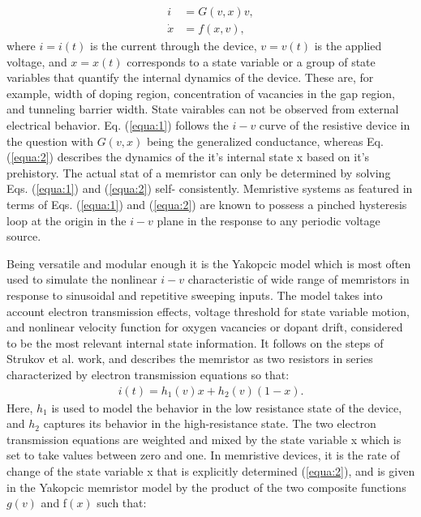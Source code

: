 \documentclass[10pt]{article}
\begin{document}
\begin{multicols}{2}
        \begin{align}
            i &= G(v,x)v, \label{equa:1} \\
            \dot{x} &= f(x,v), \label{equa:2}
        \end{align}
        where $i = i(t)$ is the current through the device, $v = v(t)$ is the applied voltage, and $x = x(t)$ corresponds to a state variable or a group of state variables that quantify the internal dynamics of the device. These are, for example, width of doping region, concentration of vacancies in the gap region, and tunneling barrier width\cite{cit8}. State vairables can not be observed from external electrical behavior. Eq. (\hyperref[equa:1]{\ref{equa:1}}) follows the $i-v$ curve of the resistive device in the question with $G(v,x)$ being the generalized conductance, whereas Eq. (\ref{equa:2}) describes the dynamics of the it's internal state x based on it's prehistory. The actual stat of a memristor can only be determined by solving Eqs. (\ref{equa:1}) and (\ref{equa:2}) self- consistently. Memristive systems as featured in terms of Eqs. (\ref{equa:1}) and (\ref{equa:2}) are known to possess a pinched hysteresis loop at the origin in the $i-v$ plane in the response to any periodic voltage source. \par
        Being versatile and modular enough it is the Yakopcic model which is most often used to simulate the nonlinear $i-v$ characteristic of wide range of memristors in response to sinusoidal and repetitive sweeping inputs. The model takes into account electron transmission effects, voltage threshold for state variable motion,
        and nonlinear velocity function for oxygen vacancies or dopant drift, considered to be the most relevant internal state information. It follows on the steps of Strukov et al. work, and describes the memristor as two resistors in series characterized by electron transmission equations so that:
        \begin{align}
            i(t) = h_1 (v)x + h_2 (v)(1-x). \label{equa:3}
        \end{align}
        Here, $h_1$ is used to model the behavior in the low resistance state of the device, and $h_2$ captures its behavior in the high-resistance state. The two electron transmission equations are weighted and mixed by the state variable x which is set to take values between zero and one. In memristive devices, it is the rate of change of the state variable x that is explicitly determined (\ref{equa:2}), and is given in the Yakopcic memristor model by the product of the two composite functions $g(v)$ and f$(x)$ such that:

\end{multicols}
\end{document}
